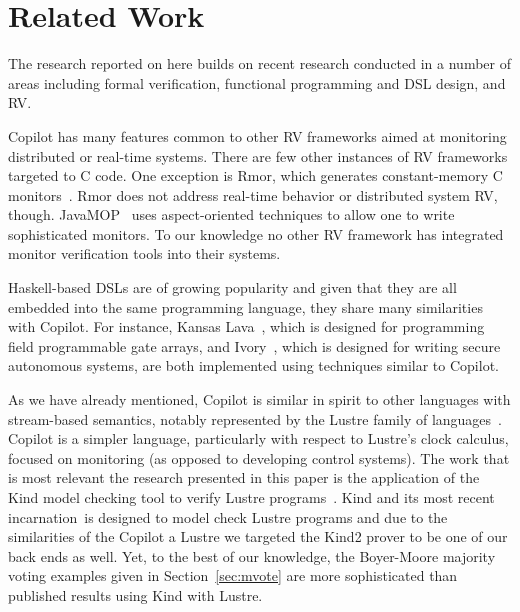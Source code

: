 \section{Related Work}\label{sec:related}
The research reported on here builds on recent  research conducted in a number
of areas including formal verification, functional programming and
DSL design, and RV. 

Copilot has many features common to other RV frameworks aimed at
 monitoring distributed or real-time systems.  
There are few other instances of RV frameworks targeted to C code.  One exception is {\sc
 Rmor}, which generates constant-memory C monitors~\cite{havelundc}.  {\sc
  Rmor} does not address real-time behavior or distributed system RV,
though.    JavaMOP~\cite{javamop}  uses aspect-oriented techniques
to allow one to write sophisticated monitors. To our knowledge no
other RV framework has integrated monitor verification tools into
their systems. 


Haskell-based DSLs are of growing popularity and given that they are all
embedded into the same programming language, they share many
similarities with Copilot. For instance, 
 Kansas Lava~\cite{Gill:14:DSLs}, which is designed for
programming  field programmable gate arrays,  and 
Ivory~\cite{pike-plpv14}, which is designed for writing secure autonomous
systems, are both implemented using techniques similar to Copilot.  




As we have already mentioned, Copilot is similar in spirit to other
languages with stream-based semantics, notably represented by the
Lustre family of languages~\cite{lustre-intro}.  Copilot is a simpler
language, particularly with respect to Lustre's clock calculus,
focused on monitoring (as opposed to developing control systems).
The work that is most
relevant the research presented in this paper is the application of
the Kind model checking tool to verify Lustre programs~\cite{Hagen08}.
Kind and its most recent incarnation~\cite{kind}is designed to model
check Lustre programs and due to the similarities of the Copilot a
Lustre we targeted the Kind2 prover to be one of our back ends as
well.  Yet, to the best of our knowledge, the Boyer-Moore majority
voting examples given in Section~\ref{sec:mvote} are more
sophisticated than published results using Kind with Lustre.
  


